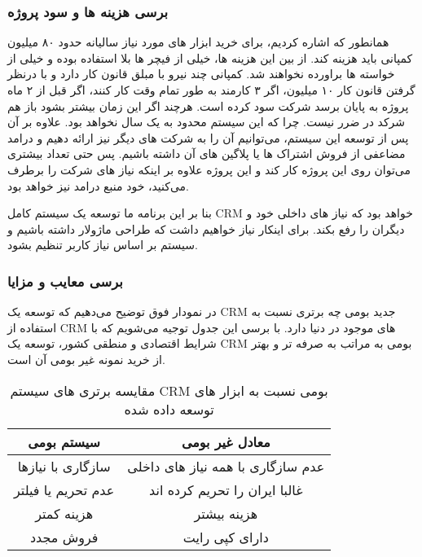 \subsubsection{برسی هزینه ها و سود پروژه}
همانطور که اشاره کردیم، برای خرید ابزار های مورد نیاز سالیانه حدود ۸۰ میلیون کمپانی باید هزینه کند. از بین این هزینه ها، خیلی از فیچر ها بلا استفاده بوده
و خیلی از خواسته ها براورده نخواهند شد.
کمپانی چند نیرو با مبلق قانون کار دارد و با درنظر گرفتن قانون کار ۱۰ میلیون، اگر ۳ کارمند به طور تمام وقت کار کنند، اگر قبل از ۲ ماه پروژه به پایان برسد شرکت سود کرده است.
هرچند اگر این زمان بیشتر بشود باز هم شرکد در ضرر نیست. چرا که این سیستم محدود به یک سال نخواهد بود.
علاوه بر آن پس از توسعه این سیستم، می‌توانیم آن را به شرکت های دیگر نیز ارائه دهیم و درامد مضاعفی از فروش اشتراک ها یا پلاگین های آن داشته باشیم.
پس حتی تعداد بیشتری می‌توان روی این پروژه کار کند و این پروژه علاوه بر اینکه نیاز های شرکت را برطرف می‌کنید، خود منبع درامد نیز خواهد بود.

بنا بر این برنامه ما توسعه یک سیستم کامل CRM خواهد بود که نیاز های داخلی خود و دیگران را رفع بکند.
برای اینکار نیاز خواهیم داشت که طراحی ماژولار داشته باشیم و سیستم بر اساس نیاز کاربر تنظیم بشود.

\subsubsection{برسی معایب و مزایا}
در نمودار فوق توضیح می‌دهیم که توسعه یک CRM جدید بومی چه برتری نسبت به استفاده از CRM های موجود در دنیا دارد.
با برسی این جدول توجیه می‌شویم که با شرایط اقتصادی و منطقی کشور، توسعه یک CRM بومی به مراتب به صرفه تر و بهتر از خرید نمونه غیر بومی آن است.

\begin{table}[H]
\begin{center}
	\caption{مقایسه برتری های سیستم CRM بومی نسبت به ابزار های توسعه داده شده}
	\label{tap:custom_crm_is_better}
	\begin{tabular}{|c|c|}
		\hline
		سیستم بومی & معادل غیر بومی \\
		\hline
		سازگاری با نیازها & عدم سازگاری با همه نیاز های داخلی \\
		\hline
		عدم تحریم یا فیلتر & غالبا ایران را تحریم کرده اند \\
		\hline
		هزینه کمتر & هزینه بیشتر \\
		\hline
		فروش مجدد & دارای کپی رایت \\
		\hline
	\end{tabular}
\end{center}
\end{table}

